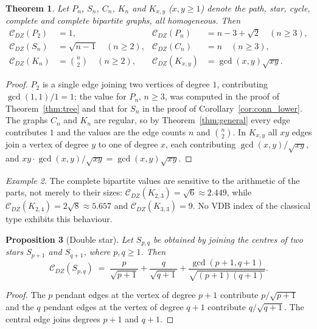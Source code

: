 \documentclass[11pt,a4paper]{article}
\theoremstyle{plain}
\newtheorem{theorem}{Theorem}[section]
\newtheorem{proposition}[theorem]{Proposition}
\theoremstyle{definition}
\theoremstyle{remark}
\newtheorem{example}[theorem]{Example}
\newcommand{\CDZ}{\mathcal{C}_{DZ}}
\newcommand{\gcdd}{\operatorname{gcd}}
\begin{document}
\begin{theorem}
\label{thm:special}
Let $P_n$, $S_n$, $C_n$, $K_n$ and $K_{x,y}$ ($x,y\ge1$) denote the path, star,
cycle, complete and complete bipartite graphs, all homogeneous. Then
\begin{align*}
  \CDZ(P_2) &= 1, &
  \CDZ(P_n) &= n-3+\sqrt2 \quad(n\ge3),\\
  \CDZ(S_n) &= \sqrt{n-1}\quad(n\ge2), &
  \CDZ(C_n) &= n\quad(n\ge3),\\
  \CDZ(K_n) &= \binom n2\quad(n\ge2), &
  \CDZ(K_{x,y}) &= \gcdd(x,y)\sqrt{xy}.
\end{align*}
\end{theorem}

\begin{proof}
$P_2$ is a single edge joining two vertices of degree $1$, contributing
$\gcdd(1,1)/1=1$; the value for $P_n$, $n\ge3$, was computed in the proof of
Theorem~\ref{thm:tree} and that for $S_n$ in the proof of
Corollary~\ref{cor:conn_lower}. The graphs $C_n$ and $K_n$ are regular, so by
Theorem~\ref{thm:general} every edge contributes $1$ and the values are the edge
counts $n$ and $\binom n2$. In $K_{x,y}$ all $xy$ edges join a vertex of degree
$y$ to one of degree $x$, each contributing $\gcdd(x,y)/\sqrt{xy}$, and
$xy\cdot\gcdd(x,y)/\sqrt{xy}=\gcdd(x,y)\sqrt{xy}$.
\end{proof}

\begin{example}
The complete bipartite values are sensitive to the arithmetic of the parts, not
merely to their sizes: $\CDZ(K_{2,3})=\sqrt6\approx2.449$, while
$\CDZ(K_{2,4})=2\sqrt8\approx5.657$ and $\CDZ(K_{3,3})=9$. No VDB index of the
classical type exhibits this behaviour.
\end{example}

\begin{proposition}[Double star]
\label{prop:double_star}
Let $S_{p,q}$ be obtained by joining the centres of two stars $S_{p+1}$ and
$S_{q+1}$, where $p,q\ge1$. Then
\[
  \CDZ(S_{p,q})\;=\;\frac{p}{\sqrt{p+1}}+\frac{q}{\sqrt{q+1}}
  +\frac{\gcdd(p+1,q+1)}{\sqrt{(p+1)(q+1)}} .
\]
\end{proposition}

\begin{proof}
The $p$ pendant edges at the vertex of degree $p+1$ contribute $p/\sqrt{p+1}$ and
the $q$ pendant edges at the vertex of degree $q+1$ contribute $q/\sqrt{q+1}$.
The central edge joins degrees $p+1$ and $q+1$.
\end{proof}
\end{document}
